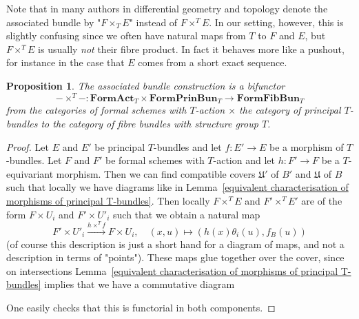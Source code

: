 \documentclass[10pt,oneside]{amsart}
\newtheorem{proposition}[theorem]{Proposition}
\theoremstyle{definition}
\begin{document}
	Note that in many authors in differential geometry and topology denote the associated bundle by "$F\times_T E$" instead of $F\times^T E$. In our setting, however, this is slightly confusing since we often have natural maps from $T$ to $F$ and $E$, but $F\times^T E$ is usually \textit{not} their fibre product. In fact it behaves more like a pushout, for instance in the case that $E$ comes from a short exact sequence.
	
	\begin{proposition}\label{associated bundle construction is bifunctor}
		The associated bundle construction is a bifunctor \[-\times^T-:\mathbf{FormAct}_T\times \mathbf{FormPrinBun}_T\rightarrow \mathbf{FormFibBun}_T\] 
		from the categories of formal schemes with $T$-action $\times$ the category of principal $T$-bundles to the category of fibre bundles with structure group $T$.
	\end{proposition}
	\begin{proof}
		Let $E$ and $E'$ be principal $T$-bundles and let $f:E'\rightarrow E$ be a morphism of $T$-bundles. Let $F$ and $F'$ be formal schemes with $T$-action and let $h:F'\rightarrow F$ be a $T$-equivariant morphism. Then we can find compatible covers $\mathfrak U'$ of $B'$ and $\mathfrak U$ of $B$ such that locally we have diagrams like in Lemma~\ref{equivalent characterisation of morphisms of principal T-bundles}. Then locally $F\times^T E$ and $F'\times^T E'$ are of the form $F\times U_i$ and $F'\times U'_i$ such that we obtain a natural map
		\[F'\times U'_i\xrightarrow{h\times^T f} F\times U_i, \quad (x,u)\mapsto (h(x)\theta_i(u),f_B(u))\]
		(of course this description is just a short hand for a diagram of maps, and not a description in terms of "points"). These maps glue together over the cover, since on intersections Lemma~\ref{equivalent characterisation of morphisms of principal T-bundles} implies that we have a commutative diagram
		\begin{center}
		\end{center}
		One easily checks that this is functorial in both components.
	\end{proof}
	
\end{document}
